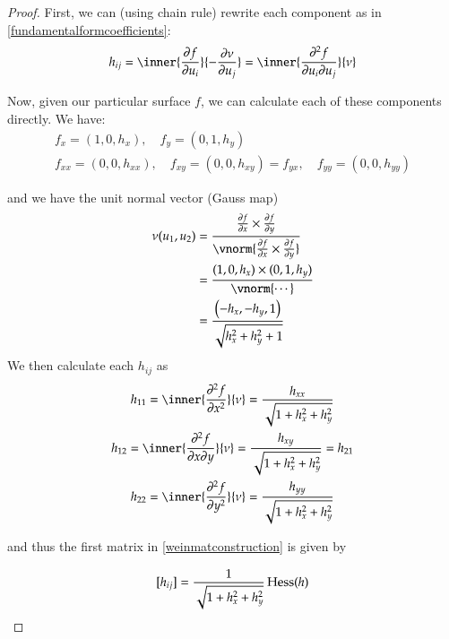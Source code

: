        	\begin{proof}
       		First, we can (using chain rule) rewrite each component as in  \cref{fundamentalformcoefficients}:
      		 \[ h_{ij} = \inner{\frac{\partial f}{\partial u_i}}{-\frac{\partial \nu}{\partial u_j}}
       		= \inner{\frac{\partial^2 f}{\partial u_i \partial u_j}}{\nu} \]
       		
       		Now, given our particular surface $f$, we can calculate each of these components directly. We have:
       		\begin{equation}
       		\begin{gathered}
       		f_{x} = (1, 0, h_x) , \quad
       		f_{y} = (0, 1, h_y)  \\
       		f_{xx} = (0, 0, h_{xx}) , \quad
       		f_{xy} = (0, 0, h_{xy}) = f_{yx} , \quad
       		f_{yy} = (0, 0, h_{yy})
       		\end{gathered}
       		\end{equation}
       		
       		and we have the unit normal vector (Gauss map)
       		\begin{align}
       		\nu(u_1, u_2) &=
       		\frac{\frac{\partial f}{\partial x} \times \frac{\partial f}{\partial y}}
       		{\vnorm{\frac{\partial f}{\partial x} \times \frac{\partial f}{\partial y}}} \\
       		&= \frac{(1, 0, h_x) \times (0, 1, h_y)}{\vnorm{\cdots}} \\
       		&= \frac{\left( -h_x , -h_y , 1 \right)}{\sqrt{h_x^2 + h_y^2 + 1}}
	 \end{align}
	 We then calculate each $h_{ij}$ as
	 \begin{equation}
	 \begin{gathered}
	 h_{11} = \inner{\frac{\partial^2 f}{\partial x^2}}{\nu} = 
		 \frac{h_{xx}}{\sqrt{1+h_x^2 + h_y^2}} \\
	  h_{12} = \inner{\frac{\partial^2 f}{\partial x \partial y}}{\nu} = 
	  \frac{h_{xy}}{\sqrt{1+h_x^2 + h_y^2}} = h_{21} \\
	  h_{22} = \inner{\frac{\partial^2 f}{\partial y^2}}{\nu} = 
	  \frac{h_{yy}}{\sqrt{1+h_x^2 + h_y^2}} \\
	 \end{gathered}
	 \end{equation}
	 
	 and thus the first matrix in \cref{weinmatconstruction} is given by
	 
	 \begin{equation} \label{hij_exactgraph}
	 [h_{ij}] = \frac{1}{\sqrt{1+h_x^2 + h_y^2}} \,  \mathrm{Hess} (h)
	 \end{equation}
	 

\end{proof}
